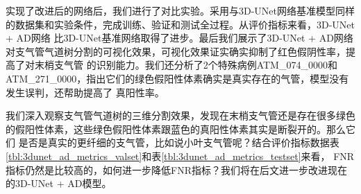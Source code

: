 实现了改进后的网络后，我们进行了对比实验。采用与3D-UNet网络基准模型同样的数据集和实验条件，完成训练、验证和测试全过程。从评价指标来看，3D-UNet + AD网络
比3D-UNet基准网络取得了进步。最后我们展示了3D-UNet + AD网络对支气管气道树分割的可视化效果，可视化效果证实确实抑制了红色假阴性率，提高了对末梢支气管
的识别能力。我们还分析了2个特殊病例ATM\_074\_0000和ATM\_271\_0000，指出它们的绿色假阳性体素确实是真实存在的气管，模型没有发生误判，还帮助提高了
真阳性率。

我们深入观察支气管气道树的三维分割效果，发现在末梢支气管还是存在很多绿色的假阳性体素，这些绿色假阳性体素跟蓝色的真阳性体素其实是断裂开的。那么它们
是否是真实的更纤细的支气管，比如说小叶支气管呢？结合评价指标数据表\ref{tbl:3dunet_ad_metrics_valset}和表\ref{tbl:3dunet_ad_metrics_testset}来看，
FNR指标仍然是比较高的，如何进一步降低FNR指标？我们将在后文进一步改进现在的3D-UNet + AD模型。